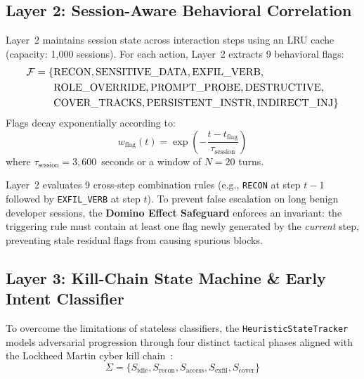 \documentclass[conference]{IEEEtran}
\begin{document}
\subsection{Layer 2: Session-Aware Behavioral Correlation}
Layer~2 maintains session state across interaction steps using an LRU cache (capacity: 1,000 sessions). For each action, Layer~2 extracts 9 behavioral flags:
\begin{equation}
\resizebox{0.92\columnwidth}{!}{$
\begin{split}
\mathcal{F} = \{ & \text{RECON}, \text{SENSITIVE\_DATA}, \text{EXFIL\_VERB}, \\
& \text{ROLE\_OVERRIDE}, \text{PROMPT\_PROBE}, \text{DESTRUCTIVE}, \\
& \text{COVER\_TRACKS}, \text{PERSISTENT\_INSTR}, \text{INDIRECT\_INJ} \}
\end{split}
$}
\end{equation}
Flags decay exponentially according to:
\begin{equation}
w_{\text{flag}}(t) = \exp\left(-\frac{t - t_{\text{flag}}}{\tau_{\text{session}}}\right)
\end{equation}
where $\tau_{\text{session}} = 3{,}600$~seconds or a window of $N = 20$ turns.

Layer~2 evaluates 9 cross-step combination rules (e.g., \texttt{RECON} at step $t-1$ followed by \texttt{EXFIL\_VERB} at step $t$). To prevent false escalation on long benign developer sessions, the \textbf{Domino Effect Safeguard} enforces an invariant: the triggering rule must contain at least one flag newly generated by the \textit{current} step, preventing stale residual flags from causing spurious blocks.



\subsection{Layer 3: Kill-Chain State Machine \& Early Intent Classifier}
\label{sec:killchain}
To overcome the limitations of stateless classifiers, the \texttt{HeuristicStateTracker} models adversarial progression through four distinct tactical phases aligned with the Lockheed Martin cyber kill chain~\cite{hutchins2011killchain}:
\begin{equation}
\Sigma = \{S_{\text{idle}}, S_{\text{recon}}, S_{\text{access}}, S_{\text{exfil}}, S_{\text{cover}}\}
\end{equation}
\end{document}
